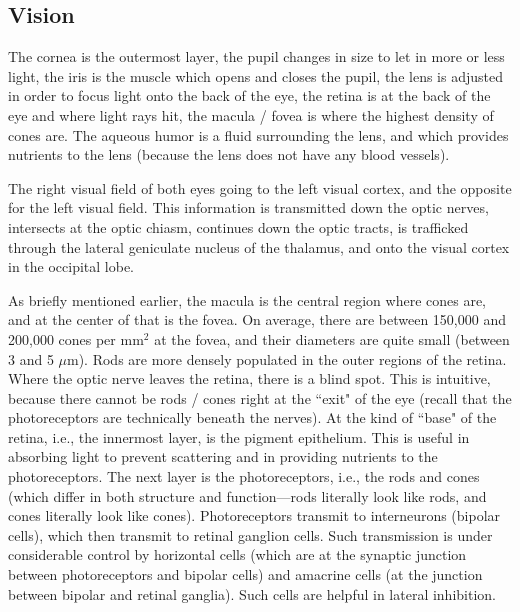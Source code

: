 \subsection{Vision}

\label{sec:Eye}

The cornea is the outermost layer, the pupil changes in size to let in more or less light, the iris is the muscle which opens and closes the pupil, the lens is adjusted in order to focus light onto the back of the eye, the retina is at the back of the eye and where light rays hit, the macula / fovea is where the highest density of cones are. The aqueous humor is a fluid surrounding the lens, and which provides nutrients to the lens (because the lens does not have any blood vessels).\newline

The right visual field of both eyes going to the left visual cortex, and the opposite for the left visual field. This information is transmitted down the optic nerves, intersects at the optic chiasm, continues down the optic tracts, is trafficked through the lateral geniculate nucleus of the thalamus, and onto the visual cortex in the occipital lobe.\newline

As briefly mentioned earlier, the macula is the central region where cones are, and at the center of that is the fovea. On average, there are between 150,000 and 200,000 cones per mm$^2$ at the fovea, and their diameters are quite small (between 3 and 5 $\mu$m). Rods are more densely populated in the outer regions of the retina. Where the optic nerve leaves the retina, there is a blind spot. This is intuitive, because there cannot be rods / cones right at the ``exit" of the eye (recall that the photoreceptors are technically beneath the nerves). At the kind of ``base" of the retina, i.e., the innermost layer, is the pigment epithelium. This is useful in absorbing light to prevent scattering and in providing nutrients to the photoreceptors. The next layer is the photoreceptors, i.e., the rods and cones (which differ in both structure and function---rods literally look like rods, and cones literally look like cones). Photoreceptors transmit to interneurons (bipolar cells), which then transmit to retinal ganglion cells. Such transmission is under considerable control by horizontal cells (which are at the synaptic junction between photoreceptors and bipolar cells) and amacrine cells (at the junction between bipolar and retinal ganglia). Such cells are helpful in lateral inhibition. \newline


